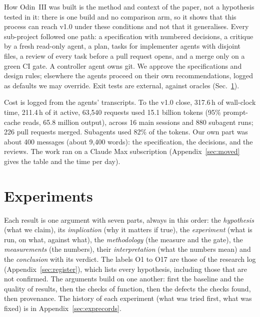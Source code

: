 \documentclass[conference]{IEEEtran}
\begin{document}
How Odin~III was built is the method and context of the paper, not a hypothesis tested in it: there is one build and no comparison arm, so it shows that this process can reach v1.0 under these conditions and not that it generalises. Every sub-project followed one path: a specification with numbered decisions, a critique by a fresh read-only agent, a plan, tasks for implementer agents with disjoint files, a review of every task before a pull request opens, and a merge only on a green CI gate. A controller agent owns git. We approve the specifications and design rules; elsewhere the agents proceed on their own recommendations, logged as defaults we may override. Exit tests are external, against oracles (Sec.~\ref{sec:results}).


Cost is logged from the agents' transcripts. To the v1.0 close, 317.6\,h of wall-clock time, 211.4\,h of it active, 63,540 requests used 15.1 billion tokens (95\% prompt-cache reads, 65.8 million output), across 16 main sessions and 880 subagent runs; 226 pull requests merged. Subagents used 82\% of the tokens. Our own part was about 400 messages (about 9,400 words): the specification, the decisions, and the reviews. The work ran on a Claude Max subscription (Appendix~\ref{sec:moved} gives the table and the time per day).

\section{Experiments}
\label{sec:results}


Each result is one argument with seven parts, always in this order: the \emph{hypothesis} (what we claim), its \emph{implication} (why it matters if true), the \emph{experiment} (what is run, on what, against what), the \emph{methodology} (the measure and the gate), the \emph{measurements} (the numbers), their \emph{interpretation} (what the numbers mean) and the \emph{conclusion} with its verdict. The labels O1 to O17 are those of the research log (Appendix~\ref{sec:register}), which lists every hypothesis, including those that are not confirmed. The arguments build on one another: first the baseline and the quality of results, then the checks of function, then the defects the checks found, then provenance. The history of each experiment (what was tried first, what was fixed) is in Appendix~\ref{sec:exprecords}.
\end{document}
